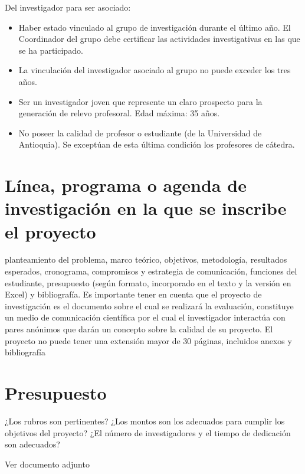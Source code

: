 \documentclass[11pt]{article}
\begin{document}
\begin{instrucciones}
  Del investigador para ser asociado:
  \begin{itemize}
  \item  Haber estado vinculado al grupo de investigación durante el último año. El Coordinador del grupo debe certificar las actividades investigativas en las que se ha participado.

  \item La vinculación del investigador asociado al grupo no puede exceder los tres años.

  \item Ser un investigador joven que represente un claro prospecto para la generación de relevo profesoral. Edad máxima: 35 años.

  \item No poseer la calidad de profesor o estudiante (de la Universidad de Antioquia). Se exceptúan de esta última condición los profesores de cátedra.
  \end{itemize}
\end{instrucciones}


\section{Línea, programa o agenda de investigación en la que se inscribe el proyecto}

\begin{instrucciones}
planteamiento del problema, marco teórico, objetivos, 
metodología, resultados esperados, cronograma, compromisos y estrategia de comunicación, funciones del 
estudiante, presupuesto (según formato, incorporado en el texto y la versión en Excel) y  bibliografía.  Es 
importante tener en cuenta que el proyecto de investigación es el documento sobre el cual se realizará la 
evaluación, constituye un medio de comunicación científica por el cual el investigador interactúa con pares 
anónimos que darán un concepto sobre la calidad de su proyecto. El proyecto no puede tener una 
extensión mayor de  30 páginas, incluidos anexos y bibliografía
\end{instrucciones}












\section{ Presupuesto}
\begin{instrucciones}
  ¿Los rubros son pertinentes? ¿Los montos son los adecuados para cumplir los objetivos del proyecto? ¿El número de investigadores y el tiempo de dedicación son adecuados?
\end{instrucciones}
Ver documento adjunto 


\end{document}
